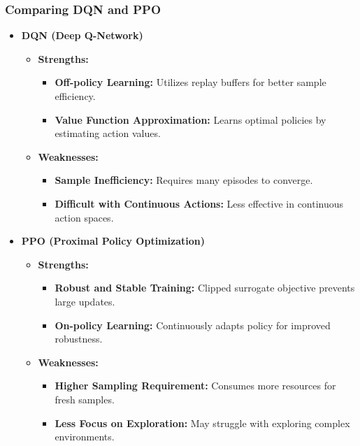 \documentclass{beamer}
\begin{document}
\begin{frame}[fragile]
    \frametitle{Comparing DQN and PPO}
    \begin{itemize}
        \item \textbf{DQN (Deep Q-Network)}
        \begin{itemize}
            \item \textbf{Strengths:}
            \begin{itemize}
                \item \textbf{Off-policy Learning:} Utilizes replay buffers for better sample efficiency.
                \item \textbf{Value Function Approximation:} Learns optimal policies by estimating action values.
            \end{itemize}
            \item \textbf{Weaknesses:}
            \begin{itemize}
                \item \textbf{Sample Inefficiency:} Requires many episodes to converge.
                \item \textbf{Difficult with Continuous Actions:} Less effective in continuous action spaces.
            \end{itemize}
        \end{itemize}
        
        \item \textbf{PPO (Proximal Policy Optimization)}
        \begin{itemize}
            \item \textbf{Strengths:}
            \begin{itemize}
                \item \textbf{Robust and Stable Training:} Clipped surrogate objective prevents large updates.
                \item \textbf{On-policy Learning:} Continuously adapts policy for improved robustness.
            \end{itemize}
            \item \textbf{Weaknesses:}
            \begin{itemize}
                \item \textbf{Higher Sampling Requirement:} Consumes more resources for fresh samples.
                \item \textbf{Less Focus on Exploration:} May struggle with exploring complex environments.
            \end{itemize}
        \end{itemize}
    \end{itemize}
\end{frame}
\end{document}
